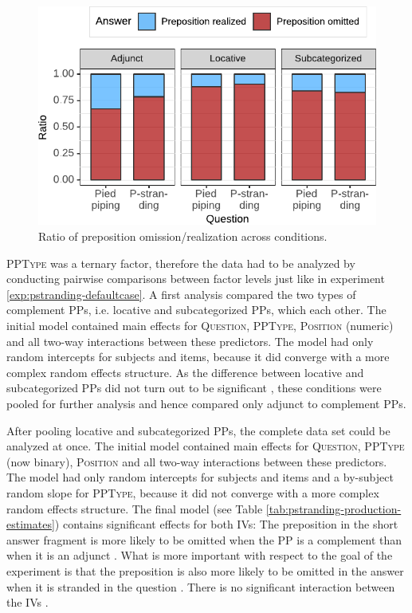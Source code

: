\begin{figure}
\includegraphics[scale=1]{figures/ex8_prod_relfrag_answers}
 \caption{Ratio of preposition omission/realization across conditions\label{fig:ex8_prod_fragments}.}
\end{figure}

\textsc{PPType} was a ternary factor, therefore the data had to be analyzed by conducting pairwise comparisons between factor levels just like in experiment \ref{exp:pstranding-defaultcase}. A first analysis compared the two types of complement PPs, i.e. locative and subcategorized PPs, which each other. The initial model contained main effects for \textsc{Question}, \textsc{PPType}, \textsc{Position} (numeric) and all two-way interactions between these predictors. The model had only random intercepts for subjects and items, because it did converge with a more complex random effects structure. As the difference between locative and subcategorized PPs did not turn out to be significant , these conditions were pooled for further analysis and hence compared only adjunct to complement PPs. 

After pooling locative and subcategorized PPs, the complete data set could be analyzed at once. 
The initial model contained main effects for \textsc{Question}, \textsc{PPType} (now binary), \textsc{Position} and all two-way interactions between these predictors. The model had only random intercepts for subjects and items and a by-subject random slope for \textsc{PPType}, because it did not converge with a more complex random effects structure. The final model (see Table \ref{tab:pstranding-production-estimates}) contains significant effects for both IVs: The preposition in the short answer fragment is more likely to be omitted when the PP is a complement than when it is an adjunct . What is more important with respect to the goal of the experiment is that the preposition is also more likely to be omitted in the answer when it is stranded in the question . There is no significant interaction between the IVs  .

